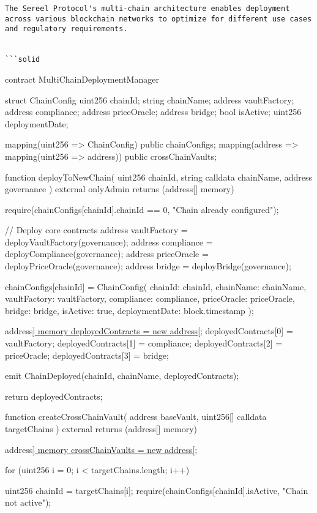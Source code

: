 \documentclass[12pt]{article}
\begin{document}
{{{\begin{lstlisting}
The Sereel Protocol's multi-chain architecture enables deployment across various blockchain networks to optimize for different use cases and regulatory requirements.


```solid
\end{lstlisting}
contract MultiChainDeploymentManager {    struct ChainConfig {        uint256 chainId;        string chainName;        address vaultFactory;        address compliance;        address priceOracle;        address bridge;        bool isActive;        uint256 deploymentDate;    }

    mapping(uint256 => ChainConfig) public chainConfigs;    mapping(address => mapping(uint256 => address)) public crossChainVaults;

    function deployToNewChain(        uint256 chainId,        string calldata chainName,        address governance    ) external onlyAdmin returns (address[] memory) {        require(chainConfigs[chainId].chainId == 0, "Chain already configured");

        // Deploy core contracts        address vaultFactory = deployVaultFactory(governance);        address compliance = deployCompliance(governance);        address priceOracle = deployPriceOracle(governance);        address bridge = deployBridge(governance);

        chainConfigs[chainId] = ChainConfig({            chainId: chainId,            chainName: chainName,            vaultFactory: vaultFactory,            compliance: compliance,            priceOracle: priceOracle,            bridge: bridge,            isActive: true,            deploymentDate: block.timestamp        });

        address\href{4}{] memory deployedContracts = new address[};        deployedContracts[0] = vaultFactory;        deployedContracts[1] = compliance;        deployedContracts[2] = priceOracle;        deployedContracts[3] = bridge;

        emit ChainDeployed(chainId, chainName, deployedContracts);

        return deployedContracts;    }

    function createCrossChainVault(        address baseVault,        uint256[] calldata targetChains    ) external returns (address[] memory) {        address\href{targetChains.length}{] memory crossChainVaults = new address[};

        for (uint256 i = 0; i < targetChains.length; i++) {            uint256 chainId = targetChains[i];            require(chainConfigs[chainId].isActive, "Chain not active");

}}}}}}
\end{document}
